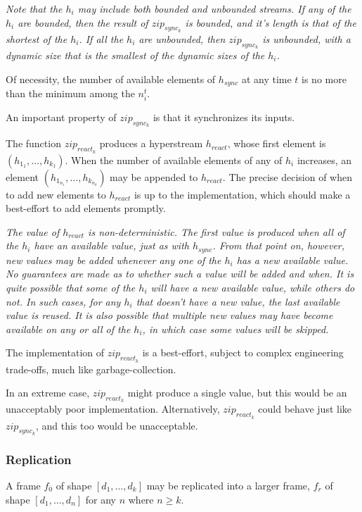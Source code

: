 \documentclass{article}
\begin{document}
{\em
Note that the $h_i$ may include both bounded and unbounded streams. If any of the $h_i$ are bounded, then the result of $zip_{sync_k}$ is bounded, and it's length is that of the shortest of the $h_i$. If all  the $h_i$ are unbounded, then $zip_{sync_k}$ is unbounded, with a dynamic size that is the smallest of the dynamic sizes of the $h_i$.

Of necessity, the number of available elements of $h_{sync}$ at any time $t$ is no more than the minimum among the $n_i^t$.

An important property of $zip_{sync_k}$ is that it synchronizes its inputs.
}

The function $zip_{react_k}$  produces a hyperstream $h_{react}$, whose first element is $(h_{1_1}, \ldots, h_{k_1})$. When the number of available elements of any of $h_i$ increases, an element $(h_{1_{n_1}}, \ldots, h_{k_{n_k}})$ may be appended to $h_{react}$. The precise decision of when to add new elements to $h_{react}$ is up to the
implementation, which should make a best-effort to add elements promptly.

{\em
The value of $h_{react}$ is non-deterministic. The first value is produced when all of the $h_i$ have an available value, just as with $h_{sync}$. From that point on, however,
new values may be added whenever any one of the $h_i$ has a new available value. No guarantees are made as to whether such a value will be added and when. It is quite possible that some of the $h_i$ will have a new available value, while others do not. In such cases, for any $h_i$ that doesn't have a new value,  the last available value is reused.
It is also possible that multiple new values may have become available on any or all of the $h_i$, in which case some values will be skipped.

The implementation of $zip_{react_k}$ is a best-effort, subject to complex engineering trade-offs, much like garbage-collection.

In an extreme case, $zip_{react_k}$ might produce a single value, but this would be an unacceptably poor implementation. Alternatively, $zip_{react_k}$ could behave just like 
$zip_{sync_k}$, and this too would be unacceptable.
}

\subsubsection{Replication}
\label{replication}

A frame $f_0$ of shape $[d_1, \ldots, d_k]$ may be replicated into a larger frame, $f_r$ of shape $[d_1, \ldots, d_n]$ for any $n$ where $n \ge k$. 
\end{document}
